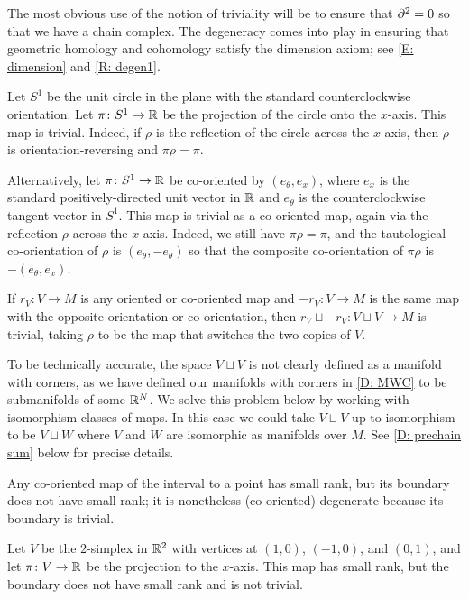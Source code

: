 The most obvious use of the notion of triviality will be to ensure that $\partial^2 = 0$ so that we have a chain complex.
The degeneracy comes into play in ensuring that geometric homology and cohomology satisfy the dimension axiom; see \cref{E: dimension} and \cref{R: degen1}.

\begin{example}
	Let $S^1$ be the unit circle in the plane with the standard counterclockwise orientation.
	Let $\pi \colon S^1 \to \mathbb{R}$ be the projection of the circle onto the $x$-axis.
	This map is trivial.
	Indeed, if $\rho$ is the reflection of the circle across the $x$-axis, then $\rho$ is orientation-reversing and $\pi \rho = \pi$.

	Alternatively, let $\pi \colon S^1 \to \mathbb{R}$ be co-oriented by $(e_\theta,e_x)$, where $e_x$ is the standard positively-directed unit vector in $\mathbb{R}$ and $e_\theta$ is the counterclockwise tangent vector in $S^1$.
	This map is trivial as a co-oriented map, again via the reflection $\rho$ across the $x$-axis.
	Indeed, we still have $\pi \rho = \pi$, and the tautological co-orientation of $\rho$ is $(e_\theta,-e_\theta)$ so that the composite co-orientation of $\pi\rho$ is $-(e_\theta,e_x)$.
\end{example}

\begin{example}
	If $r_V \colon V \to M$ is any oriented or co-oriented map and $-r_V \colon V \to M$ is the same map with the opposite orientation or co-orientation, then $r_V \sqcup -r_V \colon V \sqcup V \to M$ is trivial, taking $\rho$ to be the map that switches the two copies of $V$.

	To be technically accurate, the space $V \sqcup V$ is not clearly defined as a manifold with corners, as we have defined our manifolds with corners in \cref{D: MWC} to be submanifolds of some $\mathbb{R}^N$. We solve this problem below by working with isomorphism classes of maps. 
	In this case we could take $V \sqcup V$ up to isomorphism to be $V \sqcup W$ where $V$ and $W$ are isomorphic as manifolds over $M$. 
	See \cref{D: prechain sum} below for precise details. 
\end{example}

\begin{example}
	Any co-oriented map of the interval to a point has small rank, but its boundary does not have small rank; it is nonetheless (co-oriented) degenerate because its boundary is trivial.
\end{example}

\begin{example}\label{E: projected triangle}
	Let $V$ be the $2$-simplex in $\mathbb{R}^2$ with vertices at $(1,0)$, $(-1,0)$, and $(0,1)$, and let $\pi \colon V \to \mathbb{R}$ be the projection to the $x$-axis.
	This map has small rank, but the boundary does not have small rank and is not trivial.
\end{example}

